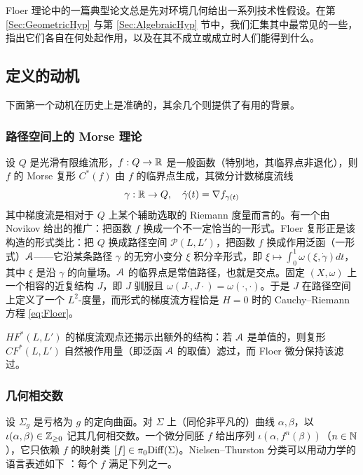 Floer 理论中的一篇典型论文总是先对环境几何给出一系列技术性假设。在第 \ref{Sec:GeometricHyp} 与第 \ref{Sec:AlgebraicHyp} 节中，我们汇集其中最常见的一些，指出它们各自在何处起作用，以及在其不成立或成立时人们能得到什么。

\subsection{定义的动机} 下面第一个动机在历史上是准确的，其余几个则提供了有用的背景。

\subsubsection{路径空间上的 Morse 理论} 设 $Q$ 是光滑有限维流形，$f: Q \rightarrow \mathbb{R}$ 是一般函数（特别地，其临界点非退化），则 $f$ 的 Morse 复形 $C^*(f)$ 由 $f$ 的临界点生成，其微分计数梯度流线
\[
\gamma: \mathbb{R} \rightarrow Q,  \quad \dot{\gamma}(t) = \nabla f_{\gamma(t)}
\]
其中梯度流是相对于 $Q$ 上某个辅助选取的 Riemann 度量而言的。有一个由 Novikov 给出的推广：把函数 $f$ 换成一个不一定恰当的一形式。Floer 复形正是该构造的形式类比：把 $Q$ 换成路径空间 $\mathcal{P}(L,L')$，把函数 $f$ 换成作用泛函（一形式）$\EuScript{A}$——它沿某条路径 $\gamma$ 的无穷小变分 $\xi$ 积分辛形式，即 $\xi \mapsto \int_0^1\omega(\xi, \dot{\gamma}) dt$，其中 $\xi$ 是沿 $\gamma$ 的向量场。$\EuScript{A}$ 的临界点是常值路径，也就是交点。固定 $(X,\omega)$ 上一个相容的近复结构 $J$，即 $J$ 驯服且 $\omega(J\cdot, J\cdot) = \omega(\cdot,\cdot)$。于是 $J$ 在路径空间上定义了一个 $L^2$-度量，而形式的梯度流方程恰是 $H=0$ 时的 Cauchy–Riemann 方程 \eqref{eq:Floer}。

\begin{Remark} \label{Rem:Filtration}
$HF^*(L,L')$ 的梯度流观点还揭示出额外的结构：若 $\EuScript{A}$ 是单值的，则复形 $CF^*(L,L')$ 自然被作用量（即泛函 $\EuScript{A}$ 的取值）滤过，而 Floer 微分保持该滤过。
\end{Remark}

\subsubsection{几何相交数} 设 $\Sigma_g$ 是亏格为 $g$ 的定向曲面。对 $\Sigma$ 上（同伦非平凡的）曲线 $\alpha, \beta$，以 $\iota(\alpha,\beta) \in \mathbb{Z}_{\geq 0}$ 记其几何相交数。一个微分同胚 $f$ 给出序列 $\iota(\alpha, f^n(\beta))$（$n\in \mathbb{N}$），它只依赖 $f$ 的映射类 $[f] \in \pi_0\mathrm{Diff}(\Sigma)$。Nielsen–Thurston 分类可以用动力学的语言表述如下 \cite{FLP}：每个 $f$ 满足下列之一。

